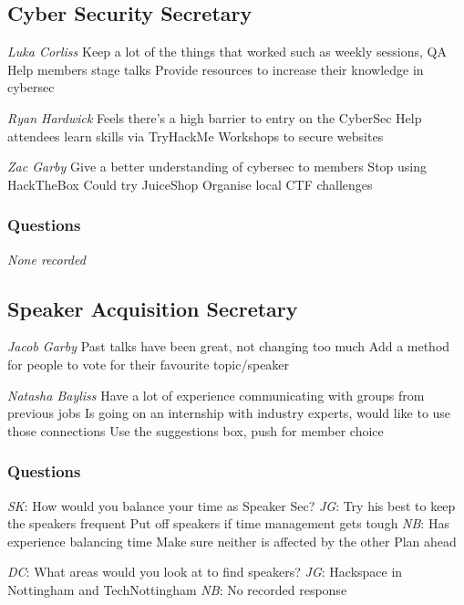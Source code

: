 \documentclass[11pt]{meetingmins}
\begin{document}
\subsection{Cyber Security Secretary}
\begin{items}
	\item
	\textit{Luka Corliss}
		\subitem
		Keep a lot of the things that worked such as weekly sessions, QA
		\subitem
		Help members stage talks
		\subitem
		Provide resources to increase their knowledge in cybersec
		
	\item
	\textit{Ryan Hardwick}
		\subitem
		Feels there’s a high barrier to entry on the CyberSec
		\subitem
		Help attendees learn skills via TryHackMe
		\subitem
		Workshops to secure websites
	
	\item
	\textit{Zac Garby}
		\subitem
		Give a better understanding of cybersec to members
		\subitem
		Stop using HackTheBox
		\subitem
		Could try JuiceShop
		\subitem
		Organise local CTF challenges
\end{items}

\subsubsection{Questions}
\textit{None recorded}

\subsection{Speaker Acquisition Secretary}
\begin{items}
	\item
	\textit{Jacob Garby}
		\subitem
		Past talks have been great, not changing too much
		\subitem
		Add a method for people to vote for their favourite topic/speaker
	
	\item
	\textit{Natasha Bayliss}	
		\subitem
		Have a lot of experience communicating with groups from previous jobs
		\subitem
		Is going on an internship with industry experts, would like to use those connections
		\subitem
		Use the suggestions box, push for member choice
\end{items}

\subsubsection{Questions}
\begin{items}
	\item
	\textit{SK}: How would you balance your time as Speaker Sec?
		\subitem
		\textit{JG}:
			\subsubitem
			Try his best to keep the speakers frequent
			\subsubitem
			Put off speakers if time management gets tough
		\subitem
		\textit{NB}:
			\subsubitem
			Has experience balancing time
			\subsubitem
			Make sure neither is affected by the other
			\subsubitem
			Plan ahead
			
	\item
	\textit{DC}: What areas would you look at to find speakers?
		\subitem
		\textit{JG}:
			\subsubitem
			Hackspace in Nottingham and TechNottingham
		\subitem
		\textit{NB}:
			\subsubitem
			No recorded response
\end{items}
\end{document}
